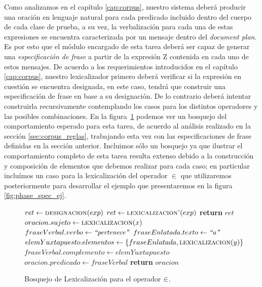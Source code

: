 Como analizamos en el capítulo \ref{cap:corpus}, nuestro sistema deberá producir una oración en lenguaje natural para cada predicado incluido dentro del cuerpo de cada clase de prueba, a su vez, la verbalización para cada una de estas expresiones se encuentra caracterizada por un mensaje dentro del \textit{document plan}. Es por esto que el módulo encargado de esta tarea deberá ser capaz de generar una \emph{especificación de frase} a partir de la expresión Z contenida en cada uno de estos mensajes. De acuerdo a los requerimientos introducidos en el capítulo \ref{cap:corpus}, nuestro lexicalizador primero deberá verificar si la expresión en cuestión se encuentra designada, en este caso, tendrá que construir una especificación de frase en base a su designación. De lo contrario deberá intentar construirla recursivamente contemplando los casos para los distintos operadores y las posibles combinaciones. En la figura~\ref{fig:algoritmo_lexicalizacion} podemos ver un bosquejo del comportamiento esperado para esta tarea, de acuerdo al análisis realizado en la sección \ref{sec:corpus_reglas}, trabajando esta vez con las especificaciones de frase definidas en la sección anterior. Incluimos sólo un bosquejo ya que ilustrar el comportamiento completo de esta tarea resulta extenso debido a la construcción y composición de elementos que debemos realizar para cada caso; en particular incluímos un caso para la lexicalización del operador $\in$ que utilizaremos posteriormente para desarrollar el ejemplo que presentaremos en la figura \ref{fig:phase_spec_ej}.

\begin{figure}
\begin{algorithm}[H]
\begin{algorithmic}
\State $ret\gets \Call{designacion}{exp}$
\Else
\State $ret\gets \Call{lexicalizacion'}{exp}$
\EndIf
\State \textbf{return} $ret$
\EndFunction
\Statex
{}
\State $oracion.sujeto\gets \Call{lexicalizacion}{x}$
\State $fraseVerbal.verbo\gets \text{\textit{``pertenece''}}$
\State $fraseEnlatada.texto\gets \text{\textit{``a''}}$
\State $elemYuxtapuesto.elementos\gets \{fraseEnlatada, \Call{lexicalizacion}{y}\}$
\State $fraseVerbal.complemento\gets elemYuxtapuesto$
\State $oracion.predicado\gets fraseVerbal$
\State \textbf{return} $oracion$
\EndFunction
\end{algorithmic}
\end{algorithm}
\label{fig:algoritmo_lexicalizacion}
\caption{Bosquejo de Lexicalización para el operador $\protect\in$.}
\end{figure}

